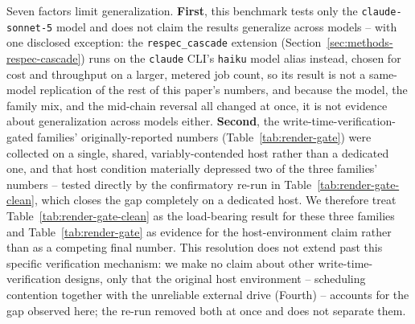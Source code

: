 \documentclass[11pt]{article}
\DeclareRobustCommand{\claim}[2]{#2}
\begin{document}
Seven factors limit generalization. \textbf{First}, \claim{model-scope-sonnet-except-respec-haiku}{this benchmark tests only
the \texttt{claude-sonnet-5} model and does not claim the results generalize across models --
with one disclosed exception: the \texttt{respec\_cascade} extension
(Section~\ref{sec:methods-respec-cascade}) runs on the \texttt{claude} CLI's \texttt{haiku} model
alias instead, chosen for cost and throughput on a larger, metered job count,} \claim{respec-model-change-interpretation}{so its result is not a same-model replication of the rest of this paper's
numbers, and because the model, the family mix, and the mid-chain reversal all changed at once,
it is not evidence about generalization across models either.}
\textbf{Second}, \claim{original-host-two-of-three-depressed}{\claim{verification-confound-reliability-cost}{the write-time-verification-gated families' originally-reported numbers
(Table~\ref{tab:render-gate}) were collected on a single, shared, variably-contended host rather
than a dedicated one, \claim{gap-was-deployment-artifact}{and that host condition materially depressed two of the three families'
numbers}}} -- \claim{rerun-is-direct-test}{tested directly by the confirmatory re-run in
Table~\ref{tab:render-gate-clean},} \claim{rerun-closed-gap-completely}{which closes the gap completely on a dedicated host.} \claim{report-both-render-gate-tables}{We
therefore treat Table~\ref{tab:render-gate-clean} as the load-bearing result for these three
families and Table~\ref{tab:render-gate} as evidence for the host-environment claim rather than as
a competing final number.} This resolution does not extend past this specific verification
mechanism: \claim{rerun-closed-gap-completely}{\claim{gap-was-deployment-artifact}{\claim{gap-causes-contention-and-drive}{we make no claim about other write-time-verification designs, only that the
original host environment -- scheduling contention together with the unreliable external drive
(Fourth) -- accounts for the gap observed here; the re-run removed both at once and does not
separate them.}}}
\end{document}
